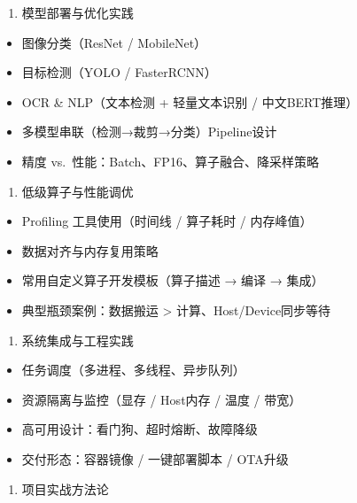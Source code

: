 \begin{enumerate}
\def\labelenumi{\arabic{enumi}.}
\setcounter{enumi}{3}
\tightlist
\item
  模型部署与优化实践
\end{enumerate}

\begin{itemize}
\tightlist
\item
  图像分类（ResNet / MobileNet）
\item
  目标检测（YOLO / FasterRCNN）
\item
  OCR \& NLP（文本检测 + 轻量文本识别 / 中文BERT推理）
\item
  多模型串联（检测→裁剪→分类）Pipeline设计
\item
  精度 vs.~性能：Batch、FP16、算子融合、降采样策略
\end{itemize}

\begin{enumerate}
\def\labelenumi{\arabic{enumi}.}
\setcounter{enumi}{4}
\tightlist
\item
  低级算子与性能调优
\end{enumerate}

\begin{itemize}
\tightlist
\item
  Profiling 工具使用（时间线 / 算子耗时 / 内存峰值）
\item
  数据对齐与内存复用策略
\item
  常用自定义算子开发模板（算子描述 → 编译 → 集成）
\item
  典型瓶颈案例：数据搬运 \textgreater{} 计算、Host/Device同步等待
\end{itemize}

\begin{enumerate}
\def\labelenumi{\arabic{enumi}.}
\setcounter{enumi}{5}
\tightlist
\item
  系统集成与工程实践
\end{enumerate}

\begin{itemize}
\tightlist
\item
  任务调度（多进程、多线程、异步队列）
\item
  资源隔离与监控（显存 / Host内存 / 温度 / 带宽）
\item
  高可用设计：看门狗、超时熔断、故障降级
\item
  交付形态：容器镜像 / 一键部署脚本 / OTA升级
\end{itemize}

\begin{enumerate}
\def\labelenumi{\arabic{enumi}.}
\setcounter{enumi}{6}
\tightlist
\item
  项目实战方法论
\end{enumerate}

